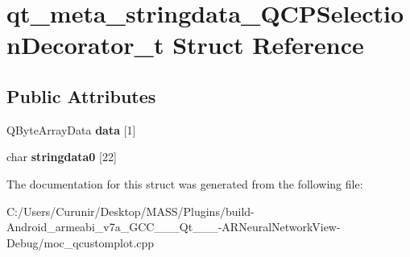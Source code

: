 \hypertarget{structqt__meta__stringdata___q_c_p_selection_decorator__t}{}\section{qt\+\_\+meta\+\_\+stringdata\+\_\+\+Q\+C\+P\+Selection\+Decorator\+\_\+t Struct Reference}
\label{structqt__meta__stringdata___q_c_p_selection_decorator__t}
\subsection*{Public Attributes}
\begin{DoxyCompactItemize}
\item 
\mbox{\label{structqt__meta__stringdata___q_c_p_selection_decorator__t_a078ea3437e1936d963d6016cb32d4c15}} 
Q\+Byte\+Array\+Data {\bfseries data} \mbox{[}1\mbox{]}
\item 
\mbox{\label{structqt__meta__stringdata___q_c_p_selection_decorator__t_ab34d143896e30635adac2dde01a0807b}} 
char {\bfseries stringdata0} \mbox{[}22\mbox{]}
\end{DoxyCompactItemize}


The documentation for this struct was generated from the following file\+:\begin{DoxyCompactItemize}
\item 
C\+:/\+Users/\+Curunir/\+Desktop/\+M\+A\+S\+S/\+Plugins/build-\/\+Android\+\_\+armeabi\+\_\+v7a\+\_\+\+G\+C\+C\+\_\+\_\+\_\+\+Qt\+\_\+\_\+\_-\/\+A\+R\+Neural\+Network\+View-\/\+Debug/moc\+\_\+qcustomplot.\+cpp\end{DoxyCompactItemize}
